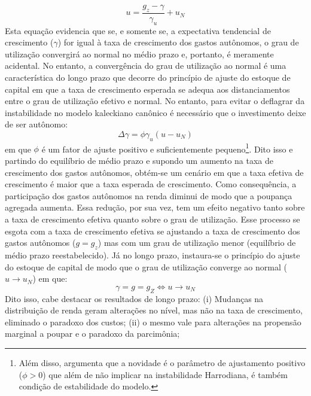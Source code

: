 \begin{equation}
\label{u_Allain}
u = \frac{g_z - \gamma}{\gamma_u} + u_N
\end{equation}
Esta equação evidencia que se, e somente se, a expectativa tendencial de crescimento ($\gamma$) for igual à taxa de crescimento dos gastos autônomos, o grau de utilização convergirá ao normal no médio prazo e, portanto, é meramente acidental. No entanto, a convergência do grau de utilização ao normal é uma característica do longo prazo que decorre do princípio de ajuste do estoque de capital em que a taxa de crescimento esperada se adequa aos distanciamentos entre o grau de utilização efetivo e normal. No entanto, para evitar o deflagrar da instabilidade no modelo kaleckiano canônico é necessário que o investimento deixe de ser autônomo: 
\begin{equation}
\label{eqAllain}
\Delta \gamma = \phi\gamma_u(u - u_N)
\end{equation}
em que $\phi$ é um fator de ajuste positivo e suficientemente pequeno\footnote{
	Além disso, \textcite[p.~14]{allain_tackling_2015} argumenta que a novidade  é o parâmetro  de ajustamento positivo ($\phi > 0$) que além de não implicar na instabilidade Harrodiana, é também condição de estabilidade do modelo.
}.
Dito isso e partindo do equilíbrio de médio prazo e supondo um aumento na taxa de crescimento dos gastos autônomos, obtém-se um cenário em que a taxa efetiva de crescimento é maior que a taxa esperada de crescimento. Como consequência, a participação dos gastos autônomos na renda diminui de modo que  a poupança agregada aumenta. Essa redução, por sua vez, tem um efeito negativo tanto sobre a taxa de crescimento efetiva quanto sobre o grau de utilização. Esse processo se esgota com a taxa de crescimento efetiva se ajustando a taxa de crescimento dos gastos autônomos ($g = g_z$) mas com um grau de utilização menor  (equilíbrio de médio prazo reestabelecido). Já no longo prazo, instaura-se o princípio do ajuste do estoque de capital de modo que o grau de utilização converge ao normal ($u \to u_N$) em que: 
$$
\gamma = g = g_Z \Leftrightarrow u \to u_N
$$
Dito isso, cabe destacar os resultados de longo prazo:
(i) Mudanças na distribuição de renda geram alterações no nível, mas não na taxa de crescimento, eliminado o paradoxo dos custos; 
(ii) o mesmo vale para alterações na propensão marginal a poupar e o paradoxo da parcimônia; 
